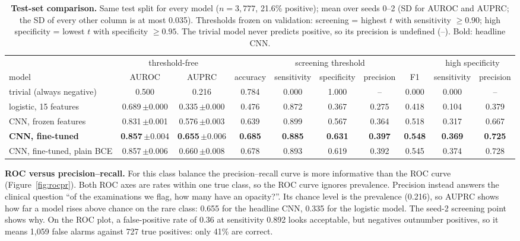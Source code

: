 \documentclass[11pt,a4paper]{article}
\begin{document}
\begin{table}[t]
\centering\footnotesize
\setlength{\tabcolsep}{2.9pt}
\caption{\textbf{Test-set comparison.} Same test split for every model ($n = 3{,}777$, 21.6\% positive); mean over seeds
0--2 (SD for AUROC and AUPRC; the SD of every other column is at most 0.035). Thresholds frozen on validation: screening =
highest $t$ with sensitivity $\geq 0.90$; high specificity = lowest $t$ with specificity $\geq 0.95$. The trivial model
never predicts positive, so its precision is undefined (--). Bold: headline CNN.}
\label{tab:comparison}
\begin{tabular}{lcc@{\hspace{8pt}}ccccc@{\hspace{8pt}}cc}
\toprule
& \multicolumn{2}{c}{threshold-free} & \multicolumn{5}{c}{screening threshold} & \multicolumn{2}{c}{high specificity} \\
\cmidrule(lr){2-3}\cmidrule(lr){4-8}\cmidrule(lr){9-10}
model & AUROC & AUPRC & accuracy & sensitivity & specificity & precision & F1 & sensitivity & precision \\
\midrule
trivial (always negative) & 0.500 & 0.216 & 0.784 & 0.000 & 1.000 & -- & 0.000 & 0.000 & -- \\
logistic, 15 features & 0.689\,{\scriptsize$\pm$0.000} & 0.335\,{\scriptsize$\pm$0.000} & 0.476 & 0.872 & 0.367 & 0.275 & 0.418 & 0.104 & 0.379 \\
CNN, frozen features & 0.831\,{\scriptsize$\pm$0.001} & 0.576\,{\scriptsize$\pm$0.003} & 0.639 & 0.899 & 0.567 & 0.364 & 0.518 & 0.317 & 0.667 \\
\textbf{CNN, fine-tuned} & \textbf{0.857}\,{\scriptsize$\pm$0.004} & \textbf{0.655}\,{\scriptsize$\pm$0.006} & \textbf{0.685} & \textbf{0.885} & \textbf{0.631} & \textbf{0.397} & \textbf{0.548} & \textbf{0.369} & \textbf{0.725} \\
CNN, fine-tuned, plain BCE & 0.857\,{\scriptsize$\pm$0.006} & 0.660\,{\scriptsize$\pm$0.008} & 0.678 & 0.893 & 0.619 & 0.392 & 0.545 & 0.374 & 0.728 \\
\bottomrule
\end{tabular}
\end{table}

\textbf{ROC versus precision--recall.} For this class balance the precision--recall curve is more informative than the
ROC curve (Figure~\ref{fig:rocpr}). Both ROC axes are rates within one true class, so the ROC curve ignores prevalence.
Precision instead answers the clinical question ``of the examinations we flag, how many have an opacity?''. Its chance level is the prevalence (0.216), so AUPRC shows how far a model rises above chance on the rare class: 0.655 for the headline CNN, 0.335 for the logistic model. The seed-2 screening point shows why. On the ROC plot, a false-positive rate of 0.36 at sensitivity 0.892 looks acceptable, but negatives outnumber positives, so it means 1{,}059 false alarms against 727 true positives: only 41\% are correct.
\end{document}

